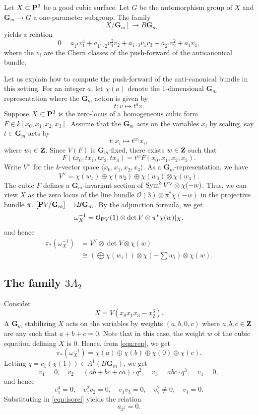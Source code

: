 \documentclass[12pt,reqno]{amsart}
\renewcommand{\to}{{\longrightarrow}}
\numberwithin{equation}{section}
\renewcommand{\O}{\mathcal O}
\newcommand{\G}{\mathbf G}
\begin{document}
Let $X \subset \P^3$ be a good cubic surface.
Let $G$ be the automorphism group of $X$ and $\G_m \to G$ a one-parameter subgroup.
The family
\[ [X/\G_m] \to B\G_m\]
yields a relation
\begin{equation}\label{eqn:isorel}
  0 = a_{1^4}v_1^4 + a_{1^2\cdot 2} v_1^2v_2 + a_{1\cdot 3} v_1v_3 + a_{2^2}v_2^2 + a_4 v_4,
\end{equation}
where the $v_i$ are the Chern classes of the push-forward of the anticanonical bundle.

Let us explain how to compute the push-forward of the anti-canonical bundle in this setting.
For an integer $a$, let $\chi(a)$ denote the $1$-dimensional $\G_m$ representation where the $\G_m$ action is given by
\[ t \colon v \mapsto t^a v.\]
Suppose $X \subset \P^3$ is the zero-locus of a homogeneous cubic form $F \in k[x_0,x_1,x_2,x_3]$.
Assume that the $\G_m$ acts on the variables $x_i$ by scaling, say $t \in \G_m$ acts by
\[ t \colon x_i \mapsto t^{w_i}x_i,\]
where $w_i \in \Z$.
Since $V(F)$ is $\G_m$-fixed, there exists $w \in \Z$ such that
\[ F \left(t x_0, t x_1, t x_2, t x_3\right) = t^w F\left(x_0, x_1, x_2,x_3\right).\]
Write $V^\vee$ for the $k$-vector space $\langle x_0, x_1, x_2,x_3 \rangle$.
As a $\G_m$-representation, we have
\[ V^\vee = \chi(w_1) \oplus \chi(w_2) \oplus \chi(w_3) \otimes \chi(w_4).\]
The cubic $F$ defines a $\G_m$-invariant section of $\Sym^3 V^\vee \otimes \chi(-w)$.
Thus, we can view $X$ as the zero locus of the line bundle $\O(3) \otimes \pi^*\chi(-w)$ in the projective bundle $\pi \colon [\P V/\G_m] \to B\G_m$.
By the adjunction formula, we get
\[ \omega_X^{-1} = \O_{\P V}(1) \otimes \det V \otimes \pi^*\chi(w) |_X,\]
and hence
\begin{equation}\label{eqn:rep}
\begin{split}
  \pi_*\left( \omega_X^{-1} \right) &= V^\vee \otimes \det V \otimes \chi(w) \\
  &\cong \left( \bigoplus \chi(w_i)  \right) \otimes \chi\left(-\sum w_i\right) \otimes \chi(w).
\end{split}
\end{equation}

\subsection{The family $3A_2$}
Consider
\[ X = V(x_0x_1x_3 - x_2^3).\]
A $\G_m$ stabilizing $X$ acts on the variables by weights $(a,b,0,c)$ where $a,b,c \in \Z$ are any such that $a+b+c = 0$.
Note that in this case, the weight $w$ of the cubic equation defining $X$ is $0$.
Hence, from \eqref{eqn:rep}, we get
\[ \pi_*\left(\omega^{-1}_X\right) = \chi(a) \oplus \chi(b) \oplus \chi(0) \oplus \chi(c).\]
Letting $q = c_1(\chi(1)) \in A^1(B\G_m)$, we get
\[ v_1 = 0, \quad v_2 = (ab+bc+ca) \cdot q^2, \quad v_3 = abc \cdot q^3, \quad v_4 = 0,\]
and hence
\[ v_1^4 = 0, \quad v_1^2v_2 = 0, \quad v_1v_3 = 0,\quad v_2^2 \neq 0, \quad v_4 = 0.\]
Substituting in \eqref{eqn:isorel} yields the relation
\begin{equation}\label{eqn:iso1}
  a_{2^2} = 0.
\end{equation}
\end{document}
